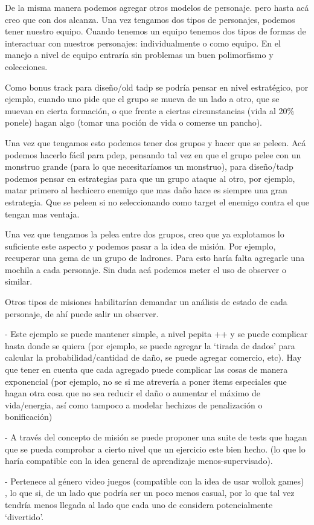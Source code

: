 De la misma manera podemos agregar otros modelos de personaje. pero hasta acá creo que con dos alcanza.
Una vez tengamos dos tipos de personajes, podemos tener nuestro equipo. Cuando tenemos un equipo tenemos
dos tipos de formas de interactuar con nuestros personajes: individualmente o como equipo. En el manejo a
nivel de equipo entraría sin problemas un buen polimorfismo y colecciones. 

Como bonus track para diseño/old tadp se podría pensar en nivel estratégico, por ejemplo, cuando uno pide que
el grupo se mueva de un lado a otro, que se muevan en cierta formación, o que frente a ciertas circunstancias
(vida al 20\% ponele) hagan algo (tomar una poción de vida o comerse un pancho).

Una vez que tengamos esto podemos tener dos grupos y hacer que se peleen. Acá podemos hacerlo fácil para pdep, 
pensando tal vez en que el grupo pelee con un monstruo grande (para lo que necesitaríamos un monstruo), 
para diseño/tadp podemos pensar en estrategias para que un grupo ataque al otro, por ejemplo, matar primero al
hechicero enemigo que mas daño hace es siempre una gran estrategia. Que se peleen si no seleccionando como target
el enemigo contra el que tengan mas ventaja. 

Una vez que tengamos la pelea entre dos grupos, creo que ya explotamos lo suficiente este aspecto y podemos pasar
a la idea de misión. Por ejemplo, recuperar una gema de un grupo de ladrones. Para esto haría falta agregarle
una mochila a cada personaje. Sin duda acá podemos meter el uso de observer o similar. 

Otros tipos de misiones habilitarían demandar un análisis de estado de cada personaje, de ahí puede salir un observer. 

- Este ejemplo se puede mantener simple, a nivel pepita ++ y se puede complicar hasta donde se quiera (por ejemplo, 
se puede agregar la ‘tirada de dados’ para calcular la probabilidad/cantidad de daño, se puede agregar comercio, 
etc). Hay que tener en cuenta que cada agregado puede complicar las cosas de manera exponencial (por ejemplo, no se
si me atrevería a poner items especiales que hagan otra cosa que no sea reducir el daño o aumentar el máximo de
vida/energia, así como tampoco a modelar hechizos de penalización o bonificación) 

- A través del concepto de misión se puede proponer una suite de tests que hagan que se pueda comprobar a
cierto nivel que un ejercicio este bien hecho. (lo que lo haría compatible con la idea general de aprendizaje
menos-supervisado).

- Pertenece al género video juegos (compatible con la idea de usar wollok games) , lo que si, de un lado que
podría ser un poco menos casual, por lo que tal vez tendría menos llegada al lado que cada uno de considera
potencialmente ‘divertido’. 
